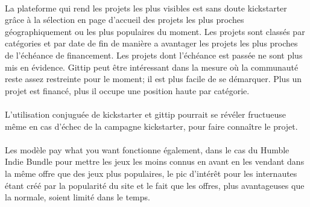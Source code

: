 \paragraph{}
La plateforme qui rend les projets les plus visibles est sans doute kickstarter
grâce à la sélection en page d'accueil des projets les plus proches
géographiquement ou les plus populaires du moment. Les projets sont classés par
catégories et par date de fin de manière a avantager les projets les plus
proches de l'échéance de financement. Les projets dont l'échéance est passée ne
sont plus mis en évidence.
Gittip peut être intéressant dans la mesure où la communauté reste assez
restreinte pour le moment; il est plus facile de se démarquer. Plus un projet
est financé, plus il occupe une position haute par catégorie.

\paragraph{}
L'utilisation conjuguée de kickstarter et gittip pourrait se révéler fructueuse
même en cas d'échec de la campagne kickstarter, pour faire connaître le projet.

\paragraph{}
Les modèle pay what you want fonctionne également, dans le cas du Humble Indie
Bundle pour mettre les jeux les moins connus en avant en les vendant dans la
même offre que des jeux plus populaires, le pic d'intérêt pour les internautes
étant créé par la popularité du site et le fait que les offres, plus
avantageuses que la normale, soient limité dans le temps.
